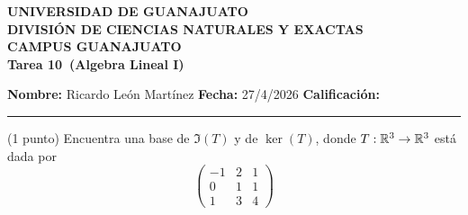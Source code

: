\documentclass[12pt,a4paper]{article}
\newcommand{\alumno}{Ricardo León Martínez}
\newcommand{\materia}{Algebra Lineal I}
\newcommand{\tarea}{Tarea 10}
\newcommand{\fecha}{27/4/2026}
\begin{document}
    \begin{center}
        {\large\textbf{UNIVERSIDAD DE GUANAJUATO}}\\[0.3cm]
        {\normalsize\textbf{DIVISIÓN DE CIENCIAS NATURALES Y EXACTAS}}\\
        {\normalsize\textbf{CAMPUS GUANAJUATO}}\\[1cm]

        {\Large\textbf{\tarea\ (\materia)}}\\[1cm]
    \end{center}

    \noindent
    \textbf{Nombre:} \alumno 
    \hfill 
    \textbf{Fecha:} \fecha 
    \hfill 
    \textbf{Calificación:} \rule{3cm}{0.4pt}

    \vspace{0.3cm}

    \begin{mdframed}[style=mdpinkbox,frametitle={Ejercicio 1}]
        (1 punto) Encuentra una base de $\Im(T)$ y de $\ker(T)$, donde $T:\mathbb{R}^{3}\to\mathbb{R}^{3}$ está
        dada por
        \begin{equation*}
            \begin{pmatrix}
                -1 & 2 & 1\\
                0 & 1 & 1\\
                1 & 3 & 4
            \end{pmatrix}
        \end{equation*}
    \end{mdframed}
\end{document}
